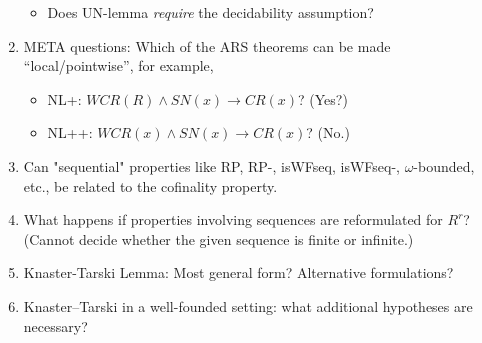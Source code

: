 \documentclass{scrartcl}
\begin{document}
\begin{enumerate}
\begin{itemize}
      \item Does UN-lemma \emph{require} the decidability assumption?
    \end{itemize}
  \item META questions: Which of the ARS theorems can be made ``local/pointwise'',
  for example,
  \begin{itemize}
    \item NL+: $WCR(R) \land SN(x) \to CR(x)$?  (Yes?)
    \item NL++: $WCR(x) \land SN(x) \to CR(x)$? (No.)
  \end{itemize}
  \item Can "sequential" properties like RP, RP-, isWFseq, isWFseq-, $\omega$-bounded, etc.,
    be related to the cofinality property.
    \item What happens if properties involving sequences are reformulated for
  $R^r$? (Cannot decide whether the given sequence is finite or infinite.)
  \item Knaster-Tarski Lemma: Most general form? Alternative formulations?
  \item Knaster--Tarski in a well-founded setting: what additional
  hypotheses are necessary?
\end{enumerate}
\end{document}

